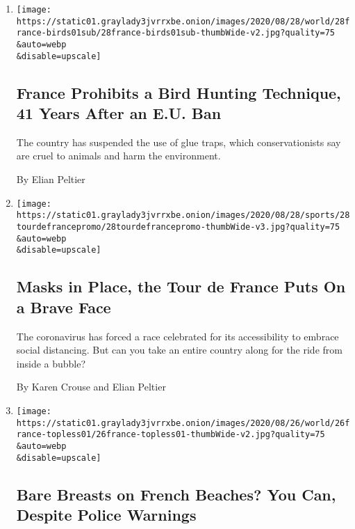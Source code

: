 \begin{enumerate}
\def\labelenumi{\arabic{enumi}.}
\item
  \href{/2020/08/28/world/europe/france-glue-traps-birds.html}{}

  \texttt{[image: https://static01.graylady3jvrrxbe.onion/images/2020/08/28/world/28france-birds01sub/28france-birds01sub-thumbWide-v2.jpg?quality=75\\\&auto=webp\\\&disable=upscale]}

  \hypertarget{france-prohibits-a-bird-hunting-technique-41-years-after-an-eu-ban}{%
  \subsection{France Prohibits a Bird Hunting Technique, 41 Years After
  an E.U.
  Ban}\label{france-prohibits-a-bird-hunting-technique-41-years-after-an-eu-ban}}

  The country has suspended the use of glue traps, which
  conservationists say are cruel to animals and harm the environment.

  By Elian Peltier
\item
  \href{/2020/08/28/sports/cycling/virus-tour-de-france.html}{}

  \texttt{[image: https://static01.graylady3jvrrxbe.onion/images/2020/08/28/sports/28tourdefrancepromo/28tourdefrancepromo-thumbWide-v3.jpg?quality=75\\\&auto=webp\\\&disable=upscale]}

  \hypertarget{masks-in-place-the-tour-de-france-puts-on-a-brave-face}{%
  \subsection{Masks in Place, the Tour de France Puts On a Brave
  Face}\label{masks-in-place-the-tour-de-france-puts-on-a-brave-face}}

  The coronavirus has forced a race celebrated for its accessibility to
  embrace social distancing. But can you take an entire country along
  for the ride from inside a bubble?

  By Karen Crouse and Elian Peltier
\item
  \href{/2020/08/26/world/europe/france-beach-topless.html}{}

  \texttt{[image: https://static01.graylady3jvrrxbe.onion/images/2020/08/26/world/26france-topless01/26france-topless01-thumbWide-v2.jpg?quality=75\\\&auto=webp\\\&disable=upscale]}

  \hypertarget{bare-breasts-on-french-beaches-you-can-despite-police-warnings}{%
  \subsection{Bare Breasts on French Beaches? You Can, Despite Police
  Warnings}\label{bare-breasts-on-french-beaches-you-can-despite-police-warnings}}


\end{enumerate}

